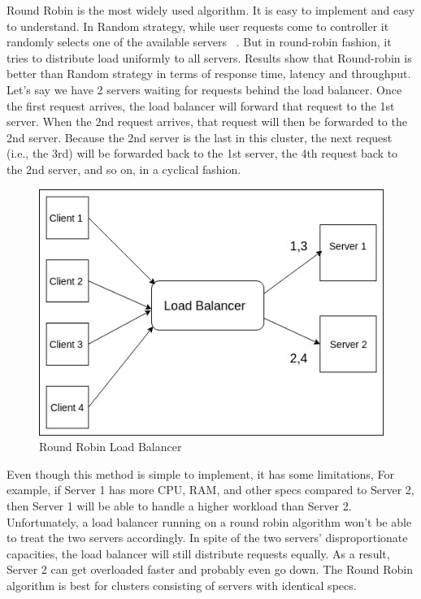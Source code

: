 \documentclass[letterpaper, 10 pt, conference]{IEEEtran}
\begin{document}
Round Robin is the most widely used algorithm. It is  easy to implement and easy to understand. 
In Random strategy, while user requests come to controller it randomly selects one of the available servers ~\cite{c3}. But in round-robin fashion, it tries to distribute load uniformly to all servers. Results show that Round-robin is better than Random strategy in terms of response time, latency and throughput.
Let's say we have 2 servers waiting for requests behind the load balancer. Once the first request arrives, the load balancer will forward that request to the 1st server. When the 2nd request arrives, that request will then be forwarded to the 2nd server.
Because the 2nd server is the last in this cluster, the next request (i.e., the 3rd) will be forwarded back to the 1st server, the 4th request back to the 2nd server, and so on, in a cyclical fashion.

\begin{figure}[ht!]
\centering
\includegraphics[width=\linewidth]{RR.jpg}
\caption{Round Robin Load Balancer \label{fig:3}}
\end{figure}

Even though this method is simple to implement, it has some limitations, For example, if Server 1 has more CPU, RAM, and other specs compared to Server 2, then Server 1 will be able to handle a higher workload than Server 2. Unfortunately, a load balancer running on a round robin algorithm won't be able to treat the two servers accordingly. In spite of the two servers' disproportionate capacities, the load balancer will still distribute requests equally. As a result, Server 2 can get overloaded faster and probably even go down. The Round Robin algorithm is best for clusters consisting of servers with identical specs.
\end{document}

